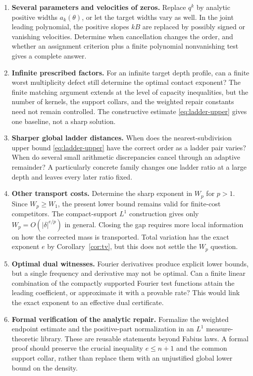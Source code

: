 \documentclass[11pt,letterpaper]{article}
\theoremstyle{definition}
\theoremstyle{remark}
\begin{document}
\begin{enumerate}[label=\textbf{Q\arabic*.},leftmargin=3.5em]
\item \textbf{Several parameters and velocities of zeros.}
Replace $q^k$ by analytic positive widths $a_k(\theta)$, or let the target widths vary as well. In the joint leading polynomial, the positive slopes $kB$ are replaced by possibly signed or vanishing velocities. Determine when cancellation changes the order, and whether an assignment criterion plus a finite polynomial nonvanishing test gives a complete answer.

\item \textbf{Infinite prescribed factors.}
For an infinite target depth profile, can a finite worst multiplicity defect still determine the optimal contact exponent? The finite matching argument extends at the level of capacity inequalities, but the number of kernels, the support collars, and the weighted repair constants need not remain controlled. The constructive estimate \eqref{eq:ladder-upper} gives one baseline, not a sharp solution.

\item \textbf{Sharper global ladder distances.}
When does the nearest-subdivision upper bound \eqref{eq:ladder-upper} have the correct order as a ladder pair varies? When do several small arithmetic discrepancies cancel through an adaptive remainder? A particularly concrete family changes one ladder ratio at a large depth and leaves every later ratio fixed.

\item \textbf{Other transport costs.}
Determine the sharp exponent in $W_p$ for $p>1$. Since $W_p\ge W_1$, the present lower bound remains valid for finite-cost competitors. The compact-support $L^1$ construction gives only $W_p=O(|\delta|^{e/p})$ in general. Closing the gap requires more local information on how the corrected mass is transported. Total variation has the exact exponent $e$ by Corollary~\ref{cor:tv}, but this does not settle the $W_p$ question.

\item \textbf{Optimal dual witnesses.}
Fourier derivatives produce explicit lower bounds, but a single frequency and derivative may not be optimal. Can a finite linear combination of the compactly supported Fourier test functions attain the leading coefficient, or approximate it with a provable rate? This would link the exact exponent to an effective dual certificate.

\item \textbf{Formal verification of the analytic repair.}
Formalize the weighted endpoint estimate and the positive-part normalization in an $L^1$ measure-theoretic library. These are reusable statements beyond Fabius laws. A formal proof should preserve the crucial inequality $e\le n+1$ and the common support collar, rather than replace them with an unjustified global lower bound on the density.
\end{enumerate}
\end{document}
